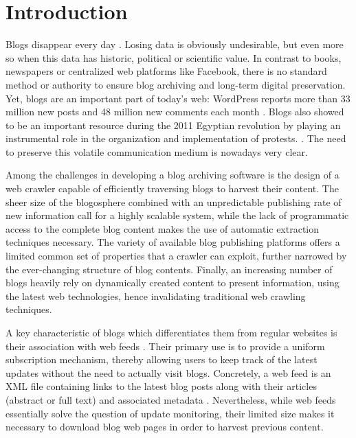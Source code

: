 \section{Introduction}

Blogs disappear every day \cite{johnson2008blogs}. Losing data is obviously undesirable, but even more so when this data has historic, political or scientific value. In contrast to books, newspapers or centralized web platforms like Facebook, there is no standard method or authority to ensure blog archiving and long-term digital preservation. Yet, blogs are an important part of today's web: WordPress reports more than 33 million new posts and 48 million new comments each month \cite{wordpress2014}. Blogs also showed to be an important resource during the 2011 Egyptian revolution by playing an instrumental role in the organization and implementation of protests. \cite{nahedeltantawy2012}. The need to preserve this volatile communication medium is nowadays very clear.

Among the challenges in developing a blog archiving software is the design of a web crawler capable of efficiently traversing blogs to harvest their content. The sheer size of the blogosphere combined with an unpredictable publishing rate of new information call for a highly scalable system, while the lack of programmatic access to the complete blog content makes the use of automatic extraction techniques necessary. The variety of available blog publishing platforms offers a limited common set of properties that a crawler can exploit, further narrowed by the ever-changing structure of blog contents. Finally, an increasing number of blogs heavily rely on dynamically created content to present information, using the latest web technologies, hence invalidating traditional web crawling techniques.

A key characteristic of blogs which differentiates them from regular websites is their association with web feeds \cite{lindahl2003weblogs}. Their primary use is to provide a uniform subscription mechanism, thereby allowing users to keep track of the latest updates without the need to actually visit blogs. Concretely, a web feed is an XML file containing links to the latest blog posts along with their articles (abstract or full text) and associated metadata \cite{board2007rss}. Nevertheless, while web feeds essentially solve the question of update monitoring, their limited size makes it necessary to download blog web pages in order to harvest previous content.


